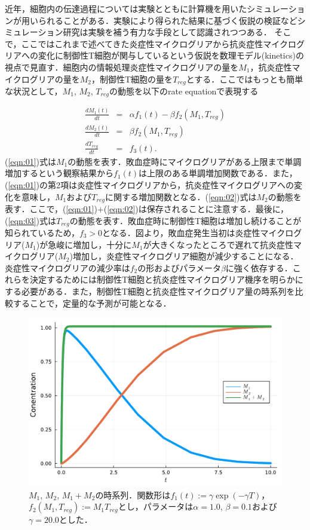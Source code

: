 \documentclass{jsarticle}
\begin{document}
近年，細胞内の伝達過程については実験とともに計算機を用いたシミュレーションが用いられることがある．実験により得られた結果に基づく仮説の検証などシミュレーション研究は実験を補う有力な手段として認識されつつある．
そこで，ここではこれまで述べてきた炎症性マイクログリアから抗炎症性マイクログリアへの変化に制御性T細胞が関与しているという仮説を数理モデル(kinetics)の視点で見直す．細胞内の情報処理炎症性マイクログリアの量を$M_1$，抗炎症性マイクログリアの量を$M_2$，制御性T細胞の量を$T_{reg}$とする．ここではもっとも簡単な状況として，$M_1$, $M_2$, $T_{reg}$の動態を以下のrate equationで表現する

\begin{eqnarray}
  \label{eqn:01}
  \frac{dM_{1}(t)}{dt} &=& \alpha f_1(t)- \beta f_2(M_1, T_{reg}) \\
  \label{eqn:02}
  \frac{dM_2(t)}{dt} &=& \beta f_2(M_1, T_{reg}) \\
  \label{eqn:03}
  \frac{dT_{reg}}{dt} &=& f_3(t).
\end{eqnarray}
(\ref{eqn:01})式は$M_1$の動態を表す．敗血症時にマイクログリアがある上限まで単調増加するという観察結果から$f_1(t)$は上限のある単調増加関数である．また，(\ref{eqn:01})の第2項は炎症性マイクログリアから，抗炎症性マイクログリアへの変化を意味し，$M_1$および$T_{reg}$に関する増加関数となる．(\ref{eqn:02})式は$M_2$の動態を表す．ここで，(\ref{eqn:01})$+$(\ref{eqn:02})は保存されることに注意する．最後に，(\ref{eqn:03})式は$T_{reg}$の動態を表す．敗血症時に制御性T細胞は増加し続けることが知られているため，$f_3>0$となる．図より，敗血症発生当初は炎症性マイクログリア($M_1$)が急峻に増加し，十分に$M_1$が大きくなったところで遅れて抗炎症性マイクログリア($M_2$)増加し，炎症性マイクログリア細胞が減少することになる．炎症性マイクログリアの減少率は$f_2$の形およびパラメータ$\beta$に強く依存する．これらを決定するためには制御性T細胞と抗炎症性マイクログリア機序を明らかにする必要がある．また，制御性T細胞と抗炎症性マイクログリア量の時系列を比較することで，定量的な予測が可能となる．

\begin{figure}[h]
  \centering
    \includegraphics[width=12cm,clip]{../fig/masafig01.pdf}
        \caption{$M_1$, $M_2$, $M_1+M_2$の時系列．関数形は$f_1(t):= \gamma\exp{(-\gamma T)}$，$f_2(M_1, T_{reg}):=M_1T_{reg}$とし，パラメータは$\alpha=1.0$, $\beta=0.1$および$\gamma=20.0$とした．}
      \label{fig:01}
  \end{figure}
\end{document}
